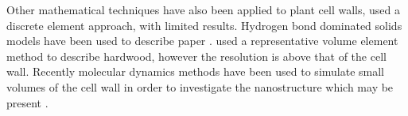 Other mathematical techniques have also been applied to plant cell walls, \cite{HEPWORTH_1998} used a discrete element approach, with limited results. Hydrogen bond dominated solids models have been used to describe paper \cite{nissan1997link}\cite{batten1987unified}\cite{nissan1987unified}\cite{batten1987unified}. \cite{Zhan_2014} used a representative volume element method to describe hardwood, however the resolution is above that of the cell wall. Recently molecular dynamics methods have been used to simulate small volumes of
the cell wall in order to investigate the nanostructure which may be present \cite{Charlier_2012}\cite{Zhang_2009}\cite{Sangha_2011}\cite{houtman1995cellulose}.

